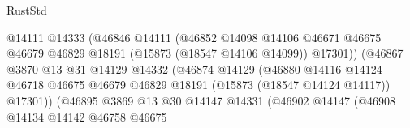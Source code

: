 \begin{lexlean}{RustStd}
\begin{coremodule}
                                              @14111
                                              @14333
                                              (@46846
                                                @14111
                                                (@46852
                                                  @14098
                                                  @14106
                                                  @46671
                                                  @46675
                                                  @46679
                                                  @46829
                                                  @18191
                                                  (@15873 (@18547 @14106 @14099))
                                                  @17301))
                                              (@46867
                                                @3870
                                                @13
                                                @31
                                                @14129
                                                @14332
                                                (@46874
                                                  @14129
                                                  (@46880
                                                    @14116
                                                    @14124
                                                    @46718
                                                    @46675
                                                    @46679
                                                    @46829
                                                    @18191
                                                    (@15873 (@18547 @14124 @14117))
                                                    @17301))
                                                (@46895
                                                  @3869
                                                  @13
                                                  @30
                                                  @14147
                                                  @14331
                                                  (@46902
                                                    @14147
                                                    (@46908
                                                      @14134
                                                      @14142
                                                      @46758
                                                      @46675

\end{coremodule}
\end{lexlean}
